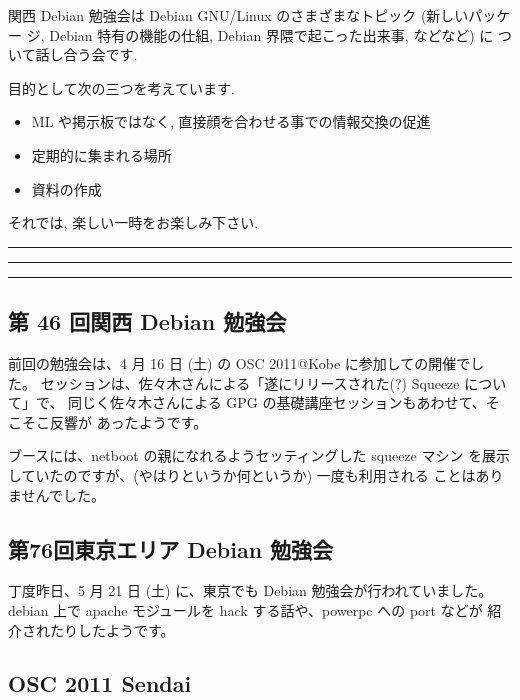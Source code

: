 \documentclass[mingoth,a4paper]{jsarticle}
\begin{document}
関西 Debian 勉強会は Debian GNU/Linux のさまざまなトピック (新しいパッケー
ジ, Debian 特有の機能の仕組, Debian 界隈で起こった出来事, などなど) に
ついて話し合う会です.

目的として次の三つを考えています.
\begin{itemize}
      \item ML や掲示板ではなく, 直接顔を合わせる事での情報交換の促進
      \item 定期的に集まれる場所
      \item 資料の作成
\end{itemize}

それでは, 楽しい一時をお楽しみ下さい.

\clearpage

\begin{minipage}[b]{0.2\hsize}
 {}
\end{minipage}
\begin{minipage}[b]{0.8\hsize}
\hrule
\vspace{2mm}
\hrule
\setcounter{tocdepth}{1}
\tableofcontents
\vspace{2mm}
\hrule
\end{minipage}



\subsection{第 46 回関西 Debian 勉強会}

前回の勉強会は、4 月 16 日 (土) の OSC 2011@Kobe に参加しての開催でした。
セッションは、佐々木さんによる「遂にリリースされた(?) Squeeze について」で、
同じく佐々木さんによる GPG の基礎講座セッションもあわせて、そこそこ反響が
あったようです。

ブースには、netboot の親になれるようセッティングした squeeze マシン
を展示していたのですが、(やはりというか何というか) 一度も利用される
ことはありませんでした。

\subsection{第76回東京エリア Debian 勉強会}

丁度昨日、5 月 21 日 (土) に、東京でも Debian 勉強会が行われていました。
debian 上で apache モジュールを hack する話や、powerpc への port などが
紹介されたりしたようです。

\subsection {OSC 2011 Sendai}
\end{document}
